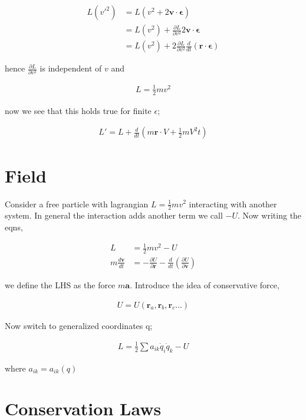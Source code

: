 \documentclass{article}
\newcommand{\mb}{\mathbf}
\begin{document}
\begin{align}
L(v'^2) &= L(v^2 + 2 \mb{v} \cdot \mb{\epsilon}) \\
&= L(v^2) + \frac{\partial L}{\partial v^2} 2 \mb{v} \cdot \mb{\epsilon} \\
&= L(v^2) + 2 \frac{\partial L}{\partial v^2} \frac{d}{d t}\left(\mb{r} \cdot \mb{\epsilon}\right)
\end{align}

hence $\frac{\partial L}{\partial v^2}$ is independent of $v$ and 

\begin{align}
L = \frac{1}{2} m v^2
\end{align}

now we see that this holds true for finite $\epsilon$; 

\begin{align}
L' = L + \frac{d}{dt}\left(m\mb{r} \cdot {V} + \frac{1}{2} m V^2 t\right)
\end{align}

\section{Field}

Consider a free particle with lagrangian $L = \frac{1}{2} m v^2$ interacting with another system. In general the interaction adds another term we call $-U$. Now writing the eqns,

\begin{align}
L &= \frac{1}{2} m v^2 - U \\
m \frac{d\mb{v}}{dt} &= -\frac{\partial U}{\partial \mb{r}} - \frac{d}{dt}\left(\frac{\partial U}{\partial \mb{v}}\right)
\end{align}

we define the LHS as the force $m\mb{a}$. Introduce the idea of conservative force, 

\begin{align}
U = U(\mb{r}_a, \mb{r}_b, \mb{r}_c ...)
\end{align}

Now switch to generalized coordinates q; 

\begin{align}
L = \frac{1}{2} \sum a_{ik} \dot{q}_i \dot{q}_k - U  
\end{align}

where $a_{ik} = a_{ik}(q)$

\section{Conservation Laws}
\end{document}
